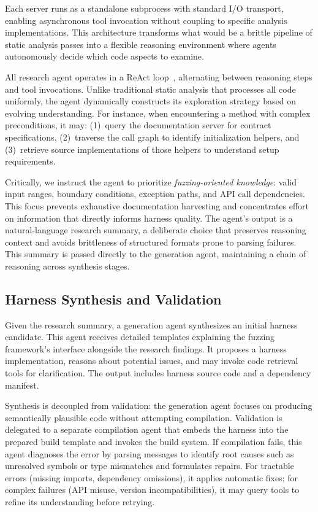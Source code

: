 \documentclass[sigconf,review,anonymous]{acmart}
\begin{document}
Each server runs as a standalone subprocess with standard I/O transport, enabling asynchronous tool invocation without coupling to specific analysis implementations. This architecture transforms what would be a brittle pipeline of static analysis passes into a flexible reasoning environment where agents autonomously decide which code aspects to examine.

All research agent operates in a ReAct loop~\cite{DBLP:conf/iclr/YaoZYDN023:ReAct}, alternating between reasoning steps and tool invocations. Unlike traditional static analysis that processes all code uniformly, the agent dynamically constructs its exploration strategy based on evolving understanding. For instance, when encountering a method with complex preconditions, it may: (1)~query the documentation server for contract specifications, (2)~traverse the call graph to identify initialization helpers, and (3)~retrieve source implementations of those helpers to understand setup requirements.

Critically, we instruct the agent to prioritize \emph{fuzzing-oriented knowledge}: valid input ranges, boundary conditions, exception paths, and API call dependencies. This focus prevents exhaustive documentation harvesting and concentrates effort on information that directly informs harness quality. The agent's output is a natural-language research summary, a deliberate choice that preserves reasoning context and avoids brittleness of structured formats prone to parsing failures. This summary is passed directly to the generation agent, maintaining a chain of reasoning across synthesis stages.

\subsection{Harness Synthesis and Validation}

Given the research summary, a generation agent synthesizes an initial harness candidate. This agent receives detailed templates explaining the fuzzing framework's interface alongside the research findings. It proposes a harness implementation, reasons about potential issues, and may invoke code retrieval tools for clarification. The output includes harness source code and a dependency manifest.

Synthesis is decoupled from validation: the generation agent focuses on producing semantically plausible code without attempting compilation. Validation is delegated to a separate compilation agent that embeds the harness into the prepared build template and invokes the build system. If compilation fails, this agent diagnoses the error by parsing messages to identify root causes such as unresolved symbols or type mismatches and formulates repairs. For tractable errors (missing imports, dependency omissions), it applies automatic fixes; for complex failures (API misuse, version incompatibilities), it may query tools to refine its understanding before retrying.
\end{document}
